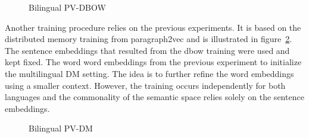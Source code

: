 \begin{figure}

\center

\caption{Bilingual PV-DBOW}
\label{f:bilingual_dbow}
\end{figure}




Another training procedure relies on the previous experiments. It is based on the distributed memory training from paragraph2vec and  is illustrated in figure~\ref{f:bilingual-dm}. 
The sentence embeddings that resulted from the dbow training were used and kept fixed. The word word embeddings from the previous experiment to initialize the multilingual DM setting. The idea is to further refine the word embeddings using a smaller context. However, the training occurs independently for both languages and the commonality of the semantic space relies solely on the sentence embeddings.

\begin{figure}

\center

\caption{Bilingual PV-DM}
\label{f:bilingual-dm}
\end{figure}

